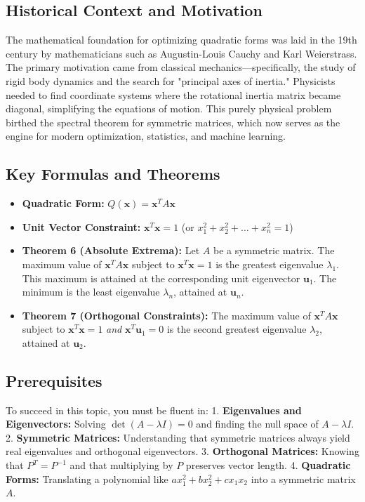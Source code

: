 \documentclass[11pt, letterpaper]{article}
\theoremstyle{definition}
\theoremstyle{remark}
\begin{document}
\subsection{Historical Context and Motivation}
The mathematical foundation for optimizing quadratic forms was laid in the 19th century by mathematicians such as Augustin-Louis Cauchy and Karl Weierstrass. The primary motivation came from classical mechanics—specifically, the study of rigid body dynamics and the search for "principal axes of inertia." Physicists needed to find coordinate systems where the rotational inertia matrix became diagonal, simplifying the equations of motion. This purely physical problem birthed the spectral theorem for symmetric matrices, which now serves as the engine for modern optimization, statistics, and machine learning.

\subsection{Key Formulas and Theorems}
\begin{itemize}
    \item \textbf{Quadratic Form:} $Q(\mathbf{x}) = \mathbf{x}^T A \mathbf{x}$
    \item \textbf{Unit Vector Constraint:} $\mathbf{x}^T\mathbf{x} = 1$ (or $x_1^2 + x_2^2 + \dots + x_n^2 = 1$)
    \item \textbf{Theorem 6 (Absolute Extrema):} Let $A$ be a symmetric matrix. The maximum value of $\mathbf{x}^T A \mathbf{x}$ subject to $\mathbf{x}^T\mathbf{x} = 1$ is the greatest eigenvalue $\lambda_1$. This maximum is attained at the corresponding unit eigenvector $\mathbf{u}_1$. The minimum is the least eigenvalue $\lambda_n$, attained at $\mathbf{u}_n$.
    \item \textbf{Theorem 7 (Orthogonal Constraints):} The maximum value of $\mathbf{x}^T A \mathbf{x}$ subject to $\mathbf{x}^T\mathbf{x} = 1$ \textit{and} $\mathbf{x}^T\mathbf{u}_1 = 0$ is the second greatest eigenvalue $\lambda_2$, attained at $\mathbf{u}_2$.
\end{itemize}

\subsection{Prerequisites}
To succeed in this topic, you must be fluent in:
1. \textbf{Eigenvalues and Eigenvectors:} Solving $\det(A - \lambda I) = 0$ and finding the null space of $A - \lambda I$.
2. \textbf{Symmetric Matrices:} Understanding that symmetric matrices always yield real eigenvalues and orthogonal eigenvectors.
3. \textbf{Orthogonal Matrices:} Knowing that $P^T = P^{-1}$ and that multiplying by $P$ preserves vector length.
4. \textbf{Quadratic Forms:} Translating a polynomial like $ax_1^2 + bx_2^2 + cx_1x_2$ into a symmetric matrix $A$.
\end{document}
